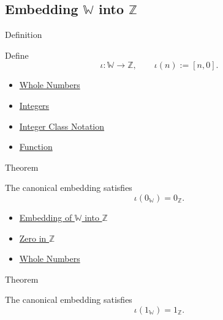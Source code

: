 \subsection*{\texorpdfstring{Embedding $\mathbb{W}$ into $\mathbb{Z}$}{Embedding W into Z}}

\begin{definitionbox}{Definition}
\begin{definition}
\label{def:canonical-embedding-w-into-z}
Define
\[
\iota:\mathbb{W}\to\mathbb{Z},
\qquad
\iota(n):=[n,0].
\]
\end{definition}
\end{definitionbox}

\begin{dependencies}
\begin{itemize}
  \item \hyperref[def:whole-numbers]{Whole Numbers}
  \item \hyperref[def:integers]{Integers}
  \item \hyperref[def:integer-class-notation]{Integer Class Notation}
  \item \hyperref[def:function]{Function}
\end{itemize}
\end{dependencies}

\begin{theorembox}{Theorem}
\begin{theorem}
\label{thm:embedding-w-into-z-preserves-zero}
The canonical embedding satisfies
\[
\iota(0_{\mathbb{W}})=0_{\mathbb{Z}}.
\]
\end{theorem}
\end{theorembox}

\begin{dependencies}
\begin{itemize}
  \item \hyperref[def:canonical-embedding-w-into-z]{Embedding of $\mathbb{W}$ into $\mathbb{Z}$}
  \item \hyperref[def:zero-in-z]{Zero in $\mathbb{Z}$}
  \item \hyperref[def:whole-numbers]{Whole Numbers}
\end{itemize}
\end{dependencies}

\begin{theorembox}{Theorem}
\begin{theorem}
\label{thm:embedding-w-into-z-preserves-one}
The canonical embedding satisfies
\[
\iota(1_{\mathbb{W}})=1_{\mathbb{Z}}.
\]
\end{theorem}
\end{theorembox}

